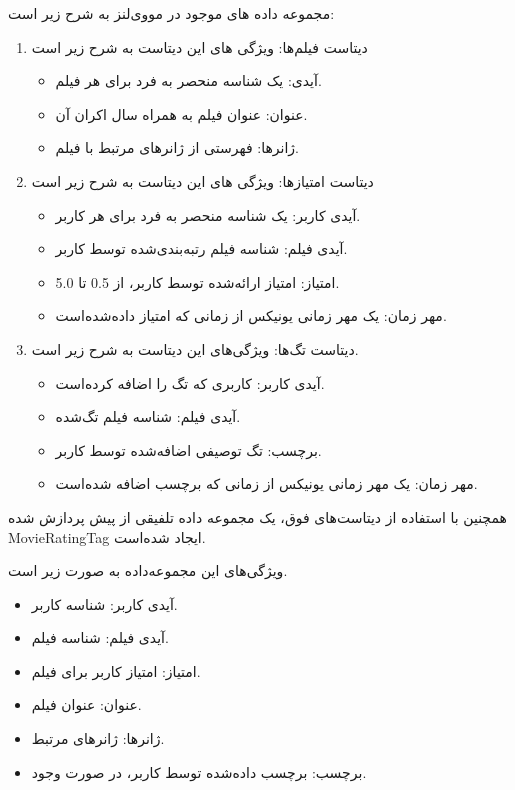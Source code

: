  مجموعه داده های موجود در مووی‌لنز به شرح زیر است:
\begin{enumerate}
\item
دیتاست فیلم‌ها:
ویژگی های این دیتاست به شرح زیر است
\begin{itemize}
\item
آیدی: یک شناسه منحصر به فرد برای هر فیلم. 
\item
عنوان: عنوان فیلم به همراه سال اکران آن. 
\item
ژانرها: فهرستی از ژانرهای مرتبط با فیلم.
\end{itemize}

\item
دیتاست امتیازها:
ویژگی های این دیتاست به شرح زیر است
\begin{itemize}
\item
آیدی کاربر: یک شناسه منحصر به فرد برای هر کاربر.
\item
آیدی فیلم: شناسه فیلم رتبه‌بندی‌شده توسط کاربر.
\item
امتیاز: امتیاز ارائه‌شده توسط کاربر، از 0.5 تا 5.0.
\item
مهر زمان: یک مهر زمانی یونیکس از زمانی که امتیاز داده‌شده‌ا‌ست.
\end{itemize}

\item
دیتاست تگ‌ها:
ویژگی‌های این دیتاست به شرح زیر است.
\begin{itemize}
\item
 آیدی کاربر: کاربری که تگ را اضافه کرده‌است.
\item
آیدی فیلم: شناسه فیلم تگ‌شده.
\item
 برچسب: تگ توصیفی اضافه‌شده توسط کاربر.
\item
مهر زمان: یک مهر زمانی یونیکس از زمانی که برچسب اضافه شده‌است.
\end{itemize}
\end{enumerate}

همچنین با استفاده از دیتاست‌های فوق، یک مجموعه داده تلفیقی از پیش پردازش شده MovieRatingTag ایجاد شده‌است.

 ویژگی‌های این مجموعه‌داده به صورت زیر است.
\begin{itemize}
\item
آیدی کاربر: شناسه کاربر.
\item
 آیدی فیلم: شناسه فیلم.
\item
 امتیاز: امتیاز کاربر برای فیلم.
\item
 عنوان: عنوان فیلم.
\item
 ژانرها: ژانرهای مرتبط.
\item
 برچسب: برچسب داده‌شده توسط کاربر، در صورت وجود.
\end{itemize}



